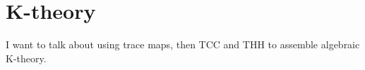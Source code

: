\section{K-theory}

I want to talk about using trace maps, then TCC and THH to assemble algebraic K-theory.